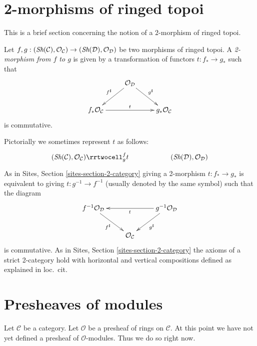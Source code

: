 \section{2-morphisms of ringed topoi}
\label{section-2-category}

\noindent
This is a brief section concerning the notion of a $2$-morphism
of ringed topoi.

\begin{definition}
\label{definition-2-morphism-ringed-topoi}
Let
$f, g :
(\mathop{\textit{Sh}}\nolimits(\mathcal{C}), \mathcal{O}_\mathcal{C})
\to
(\mathop{\textit{Sh}}\nolimits(\mathcal{D}), \mathcal{O}_\mathcal{D})$
be two morphisms of ringed topoi. A {\it 2-morphism from $f$ to $g$}
is given by a transformation of functors $t : f_* \to g_*$ such that
$$
\xymatrix{
& \mathcal{O}_\mathcal{D}
\ar[ld]_{f^\sharp}
\ar[rd]^{g^\sharp} \\
f_*\mathcal{O}_\mathcal{C} \ar[rr]^t & &
g_*\mathcal{O}_\mathcal{C}
}
$$
is commutative.
\end{definition}

\noindent
Pictorially we sometimes represent $t$ as follows:
$$
\xymatrix{
(\Sh(\mathcal{C}), \mathcal{O}_\mathcal{C})
\rrtwocell^f_g{t}
&
&
(\Sh(\mathcal{D}), \mathcal{O}_\mathcal{D})
}
$$
As in
Sites, Section \ref{sites-section-2-category}
giving a 2-morphism $t : f_* \to g_*$ is equivalent to giving
$t : g^{-1} \to f^{-1}$ (usually denoted by the same symbol)
such that the diagram
$$
\xymatrix{
f^{-1}\mathcal{O}_\mathcal{D}
\ar[rd]_{f^\sharp}  & &
g^{-1}\mathcal{O}_\mathcal{D} \ar[ll]^t \ar[ld]^{g^\sharp} \\
& \mathcal{O}_\mathcal{C}
}
$$
is commutative. As in
Sites, Section \ref{sites-section-2-category}
the axioms of a strict 2-category hold with horizontal and
vertical compositions defined as explained in loc.\ cit.










\section{Presheaves of modules}
\label{section-presheaves-modules}

\noindent
Let $\mathcal{C}$ be a category.
Let $\mathcal{O}$ be a presheaf of rings on $\mathcal{C}$.
At this point we have not yet defined a presheaf of $\mathcal{O}$-modules.
Thus we do so right now.

